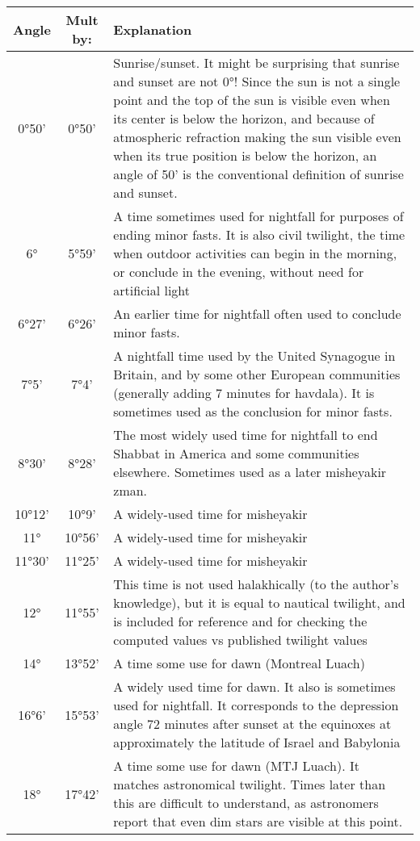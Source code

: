 \begin{tabular}{c | c | p{}}
	Angle&Mult by:&Explanation\\\hline
	0°50'&0°50'&Sunrise/sunset. It might be surprising that sunrise and sunset are not 0°! Since the sun is not a single point and the top of the sun is visible even when its center is below the horizon, and because of atmospheric refraction making the sun visible even when its true position is below the horizon, an angle of 50' is the conventional definition of sunrise and sunset.\\\hline
	6°&5°59'&A time sometimes used for nightfall for purposes of ending minor fasts.  It is also civil twilight, the time when outdoor activities can begin in the morning, or conclude in the evening, without need for artificial light\\\hline
	6°27'&6°26'
	&An earlier time for nightfall often used to conclude minor fasts.\\\hline
	7°5'&7°4'&A nightfall time used by the United Synagogue in Britain, and by some other European communities (generally adding 7 minutes for havdala). It is sometimes used as the conclusion for minor fasts.\\\hline
	8°30'&8°28'&The most widely used time for nightfall to end Shabbat in America and some communities elsewhere. Sometimes used as a later misheyakir zman.\\\hline
	10°12'&10°9'&A widely-used time for misheyakir\\\hline
	11°&10°56'&A widely-used time for misheyakir\\\hline
	11°30'&11°25'&A widely-used time for misheyakir\\\hline
	12°&11°55'&This time is not used halakhically (to the author's knowledge), but it is equal to nautical twilight, and is included for reference and for checking the computed values vs published twilight values\\\hline
	14°&13°52'&A time some use for dawn (Montreal Luach)\\\hline
	16°6'&15°53'&A widely used time for dawn. It also is sometimes used for nightfall. It corresponds to the depression angle 72 minutes after sunset at the equinoxes at approximately the latitude of Israel and Babylonia\\\hline
	18°&17°42'&A time some use for dawn (MTJ Luach). It matches astronomical twilight. Times later than this are difficult to understand, as astronomers report that even dim stars are visible at this point.\\\hline

\end{tabular}
